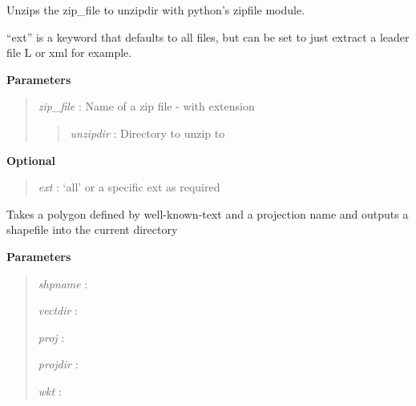 \documentclass[letterpaper,10pt,openany,oneside]{sphinxmanual}
\begin{document}

\begin{fulllineitems}
\label{code:Util.unZip}
Unzips the zip\_file to unzipdir with python's zipfile module.

``ext'' is a keyword that defaults to all files, but can be set
to just extract a leader file L or xml for example.

\textbf{Parameters}
\begin{quote}

\emph{zip\_file} : Name of a zip file - with extension
\begin{quote}

\emph{unzipdir} : Directory to unzip to
\end{quote}
\end{quote}

\textbf{Optional}
\begin{quote}

\emph{ext}      : `all' or a specific ext as required
\end{quote}

\end{fulllineitems}


\begin{fulllineitems}
\label{code:Util.wkt2shp}
Takes a polygon defined by well-known-text and a projection name and outputs
a shapefile into the current directory

\textbf{Parameters}
\begin{quote}

\emph{shpname} :

\emph{vectdir} :

\emph{proj}    :

\emph{projdir} :

\emph{wkt}     :
\end{quote}

\end{fulllineitems}

\end{document}
